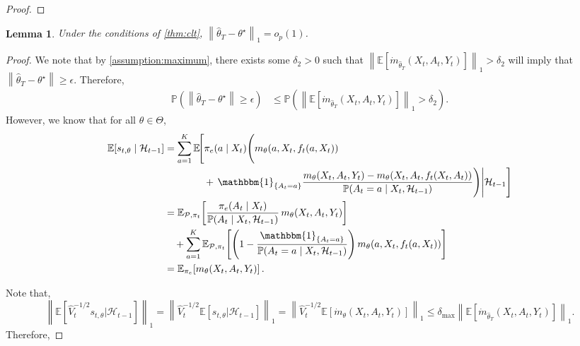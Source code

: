 \documentclass[11pt]{article}
\newcommand{\E}{\mathbb{E}}
\newcommand{\norm}[1]{\left\lVert#1\right\rVert}
\newtheorem{lemma}{Lemma}
\begin{document}
\begin{appendix}
\begin{proof}
\end{proof}
\begin{lemma} \label{lemma:consistency}
Under the conditions of \cref{thm:clt}, $\norm{\hat{\theta}_{T}-  \theta^{\star}}_{1} = o_{p}(1)$.
\end{lemma}
\begin{proof}
We note that by \cref{assumption:maximum}, there exists some $\delta_{2} > 0$ such that $\norm{ \E\left[ \dot{m}_{\hat{\theta}_{T} }(X_{t},A_{t},Y_{t}) \right]}_{1} > \delta_{2}$ will imply that $\norm{\hat{\theta}_{T} - \theta^{\star}} \ge \epsilon$. Therefore, 
\begin{align*}
    \mathbb{P} \left(\norm{\hat{\theta}_{T} - \theta^{\star}} \ge \epsilon \right) &\le \mathbb{P} \left( \norm{ \E\left[ \dot{m}_{\hat{\theta}_{T} }(X_{t},A_{t},Y_{t}) \right]}_{1} > \delta_{2} \right).
\end{align*}
However, we know that for all $\theta \in \Theta$, 
\begin{align*}
\E\!\left[s_{t,\theta}\mid \mathcal{H}_{t-1}\right]
&=
\sum_{a=1}^{K}
\E\!\Bigg[
\Bigg.
\pi_{e}(a \mid X_{t})
\Bigg(
m_{\theta}(a,X_{t},f_{t}(a,X_{t}))  \\
&\qquad\qquad
+\, \mathbbm{1}_{\{A_{t}=a\}}
\frac{
m_{\theta}(X_{t},A_{t},Y_{t})
-
m_{\theta}(X_{t},A_{t},f_{t}(X_{t},A_{t}))
}{
\mathbb{P}(A_{t}=a \mid X_{t},\mathcal{H}_{t-1})
}
\Bigg)
\Bigg| \mathcal{H}_{t-1}
\Bigg] \\
&=
\E_{\mathcal{P},\pi_{t}}\!\left[
\frac{\pi_{e}(A_{t}\mid X_{t})}{\mathbb{P}(A_{t}\mid X_{t},\mathcal{H}_{t-1})}
\, m_{\theta}(X_{t},A_{t},Y_{t})
\right] \\
&\quad
+ \sum_{a =1}^{K}
\E_{\mathcal{P},\pi_{t}}\!\left[
\left(
1 -
\frac{\mathbbm{1}_{\{A_t=a\}}}{\mathbb{P}(A_{t}=a\mid X_{t}, \mathcal{H}_{t-1})}
\right)
m_{\theta}(a,X_{t},f_{t}(a,X_{t}))
\right] \\
&=
\E_{\pi_{e}}\!\left[ m_{\theta}(X_{t},A_{t},Y_{t}) \right].
\end{align*}


Note that, 
$$\norm{\mathbb{E}\left[\hat{V}_{t}^{-1/2}s_{t,\theta} | \mathcal{H}_{t-1}\right]}_{1} = \norm{\hat{V}_{t}^{-1/2} \E\left[s_{t,\theta} |\mathcal{H}_{t-1}\right]}_{1} =  \norm{ \hat{V}_{t}^{-1/2} \E\left[\dot{m}_{\theta} (X_{t},A_{t},Y_{t})\right]}_{1} \le \delta_{\text{max}}  \norm{\E\left[ \dot{m}_{\hat{\theta}_{T}}(X_{t},A_{t},Y_{t}) \right]}_{1}.$$
Therefore,


\end{proof}
\end{appendix}
\end{document}
